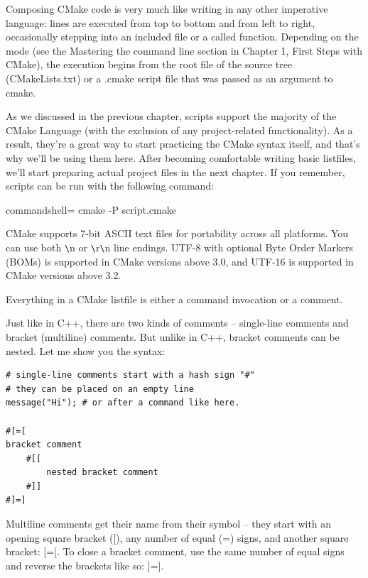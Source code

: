 
Composing CMake code is very much like writing in any other imperative language: lines are executed from top to bottom and from left to right, occasionally stepping into an included file or a called function. Depending on the mode (see the Mastering the command line section in Chapter 1, First Steps with CMake), the execution begins from the root file of the source tree (CMakeLists.txt) or a .cmake script file that was passed as an argument to cmake.

As we discussed in the previous chapter, scripts support the majority of the CMake Language (with the exclusion of any project-related functionality). As a result, they're a great way to start practicing the CMake syntax itself, and that's why we'll be using them here. After becoming comfortable writing basic listfiles, we'll start preparing actual project files in the next chapter. If you remember, scripts can be run with the following command:

\begin{tcblisting}{commandshell={}}
cmake -P script.cmake
\end{tcblisting}

\begin{tcolorbox}[colback=blue!5!white,colframe=blue!75!black,title=Note]
CMake supports 7-bit ASCII text files for portability across all platforms. You can use both \verb|\|n or \verb|\|r\verb|\|n line endings. UTF-8 with optional Byte Order Markers (BOMs) is supported in CMake versions above 3.0, and UTF-16 is supported in CMake versions above 3.2.
\end{tcolorbox}

Everything in a CMake listfile is either a command invocation or a comment.


Just like in C++, there are two kinds of comments – single-line comments and bracket (multiline) comments. But unlike in C++, bracket comments can be nested. Let me show you the syntax:

\begin{lstlisting}[style=styleCMake]	
# single-line comments start with a hash sign "#"
# they can be placed on an empty line
message("Hi"); # or after a command like here.

#[=[
bracket comment
	#[[
		nested bracket comment
	#]]
#]=]
\end{lstlisting}

Multiline comments get their name from their symbol – they start with an opening square bracket ([), any number of equal (=) signs, and another square bracket: [=[. To close a bracket comment, use the same number of equal signs and reverse the brackets like so: ]=].

